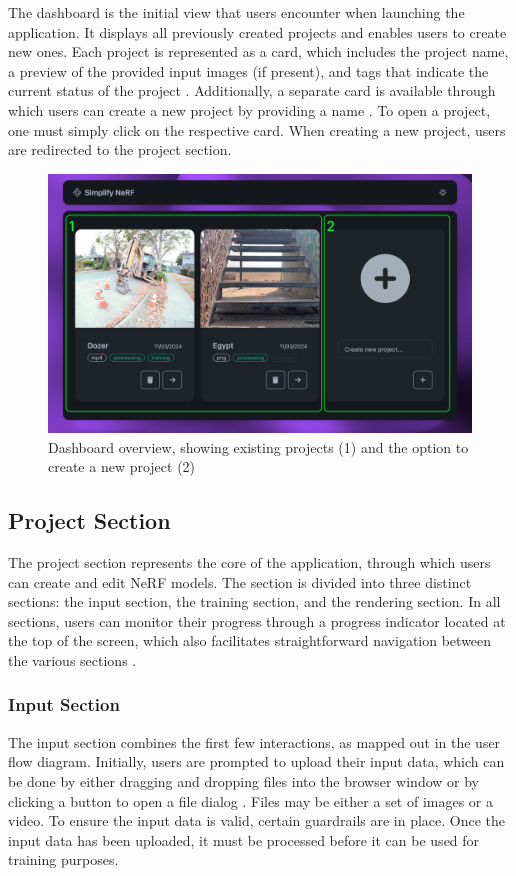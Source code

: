 The dashboard is the initial view that users encounter when launching the application.
It displays all previously created projects and enables users to create new ones.
Each project is represented as a card, which includes the project name, a preview of the provided input images (if present), and tags that indicate the current status of the project .
Additionally, a separate card is available through which users can create a new project by providing a name .
To open a project, one must simply click on the respective card.
When creating a new project, users are redirected to the project section.

\begin{figure}[htb]
  \centering
  \includegraphics[width=.65\textwidth]{figures/view-overview.png}
  \caption{Dashboard overview, showing existing projects (1) and the option to create a new project (2)}
  \label{fig:design:dashboard}
\end{figure}

\subsection*{Project Section}

The project section represents the core of the application, through which users can create and edit NeRF models.
The section is divided into three distinct sections: the input section, the training section, and the rendering section.
In all sections, users can monitor their progress through a progress indicator located at the top of the screen, which also facilitates straightforward navigation between the various sections .

\subsubsection*{Input Section}

The input section combines the first few interactions, as mapped out in the user flow diagram.
Initially, users are prompted to upload their input data, which can be done by either dragging and dropping files into the browser window or by clicking a button to open a file dialog .
Files may be either a set of images or a video. To ensure the input data is valid, certain guardrails are in place.
Once the input data has been uploaded, it must be processed before it can be used for training purposes.

